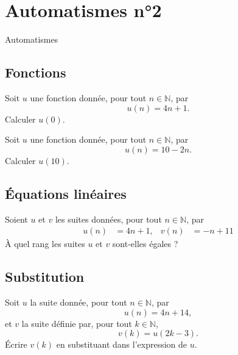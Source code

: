 \documentclass[14pt]{beamer}
\newcommand{\N}{\mathbb{N}}
\begin{document}
\section{Automatismes n°2}

\begin{frame}

\centering \huge
Automatismes

\end{frame}

\subsection{Fonctions}

\begin{frame}{1}

	Soit $u$ une fonction donnée, pour tout $n\in\N$, par
		\[ u(n) = 4n+1. \]
	Calculer $u(0)$.
\end{frame}


\begin{frame}{2}
	Soit $u$ une fonction donnée, pour tout $n\in\N$, par
		\[ u(n) = 10-2n. \]
	Calculer $u(10)$.
\end{frame}

\subsection{Équations linéaires}

\begin{frame}{3}

	Soient $u$ et $v$ les suites données, pour tout $n\in\N$, par
		\begin{align*}
			u(n) &= 4n+1, & v(n) &= -n+11
		\end{align*}
	À quel rang les suites $u$ et $v$ sont-elles égales ?

\end{frame}

\subsection{Substitution}

\begin{frame}{4}

	Soit $u$ la suite donnée, pour tout $n\in\N$, par
		\[ u(n) = 4n+14, \]
	et $v$ la suite définie par, pour tout $k\in\N$, 
		\[ v(k) = u(2k-3). \]
	Écrire $v(k)$ en substituant dans l'expression de $u$.

\end{frame}
\end{document}
